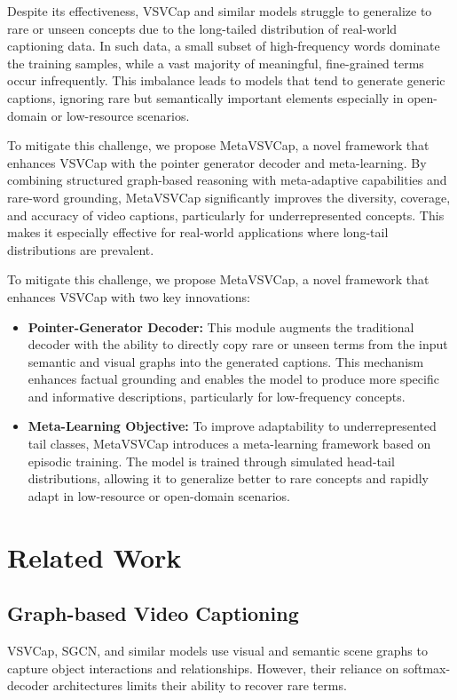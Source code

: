 \documentclass[journal]{IEEEtran}
\begin{document}
Despite its effectiveness, VSVCap and similar models struggle to generalize to rare or unseen concepts due to the long-tailed distribution of real-world captioning data. In such data, a small subset of high-frequency words dominate the training samples, while a vast majority of meaningful, fine-grained terms occur infrequently. This imbalance leads to models that tend to generate generic captions, ignoring rare but semantically important elements especially in open-domain or low-resource scenarios.

To mitigate this challenge, we propose MetaVSVCap, a novel framework that enhances VSVCap with the pointer generator decoder and meta-learning. By combining structured graph-based reasoning with meta-adaptive capabilities and rare-word grounding, MetaVSVCap significantly improves the diversity, coverage, and accuracy of video captions, particularly for underrepresented concepts. This makes it especially effective for real-world applications where long-tail distributions are prevalent.

To mitigate this challenge, we propose MetaVSVCap, a novel framework that enhances VSVCap with two key innovations:

\begin{itemize}
    \item \textbf{Pointer-Generator Decoder:} This module augments the traditional decoder with the ability to directly copy rare or unseen terms from the input semantic and visual graphs into the generated captions. This mechanism enhances factual grounding and enables the model to produce more specific and informative descriptions, particularly for low-frequency concepts.
    
    \item \textbf{Meta-Learning Objective:} To improve adaptability to underrepresented tail classes, MetaVSVCap introduces a meta-learning framework based on episodic training. The model is trained through simulated head-tail distributions, allowing it to generalize better to rare concepts and rapidly adapt in low-resource or open-domain scenarios.
\end{itemize}

\section{Related Work}
\subsection{Graph-based Video Captioning}
VSVCap, SGCN, and similar models use visual and semantic scene graphs to capture object interactions and relationships. However, their reliance on softmax-decoder architectures limits their ability to recover rare terms.
\end{document}
